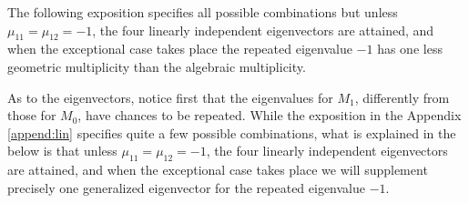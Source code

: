 \documentclass[a4paper,11pt]{article}
\begin{document}

The following exposition specifies all possible combinations but unless $\mu_{11}=\mu_{12}=-1$, the four linearly independent eigenvectors are attained, and when the exceptional case takes place the repeated eigenvalue $-1$ has one less geometric multiplicity than the algebraic multiplicity.%

As to the eigenvectors, notice first that the eigenvalues for $M_1$, differently from those for $M_0$, have chances to be repeated. While the exposition in the Appendix \ref{append:lin} specifies quite a few possible combinations, what is explained in the below is that unless $\mu_{11}=\mu_{12}=-1$, the four linearly independent eigenvectors are attained, and when the exceptional case takes place we will supplement precisely one generalized eigenvector for the repeated eigenvalue $-1$.
\end{document}

